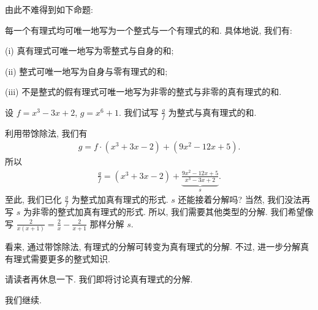 由此不难得到如下命题:
\begin{proposition}
    每一个有理式均可唯一地写为一个整式与一个有理式的和. 具体地说, 我们有:

    (i) 真有理式可唯一地写为零整式与自身的和;

    (ii) 整式可唯一地写为自身与零有理式的和;

    (iii) 不是整式的假有理式可唯一地写为非零的整式与非零的真有理式的和.
\end{proposition}

\begin{example}
    设 $f = x^3 - 3x + 2$, $g = x^6 + 1$. 我们试写 $\frac{g}{f}$ 为整式与真有理式的和.

    利用带馀除法, 我们有
    \begin{align*}
        g = f \cdot (x^3 + 3x - 2) + (9x^2 - 12x + 5).
    \end{align*}
    所以
    \begin{align*}
        \frac{g}{f} = (x^3 + 3x - 2) + \underbrace{\frac{9x^2 - 12x + 5}{x^3 - 3x + 2}}_{s}.
    \end{align*}
    至此, 我们已化 $\frac{g}{f}$ 为整式加真有理式的形式. $s$ 还能接着分解吗? 当然, 我们没法再写 $s$ 为非零的整式加真有理式的形式. 所以, 我们需要其他类型的分解. 我们希望像写 $\frac{2}{x(x+1)} = \frac{2}{x} - \frac{2}{x+1}$ 那样分解 $s$.
\end{example}

看来, 通过带馀除法, 有理式的分解可转变为真有理式的分解. 不过, 进一步分解真有理式需要更多的整式知识.

请读者再休息一下. 我们即将讨论真有理式的分解.

\myLine

我们继续.

